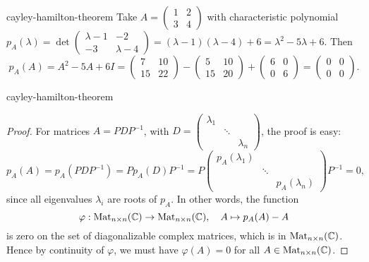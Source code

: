 \begin{example}{cayley-hamilton-theorem}
    Take $A = \begin{pmatrix} 1 & 2 \\ 3 & 4 \end{pmatrix}$ with characteristic polynomial $p_A(\lambda) = \det \begin{pmatrix} \lambda - 1 & -2 \\ -3 & \lambda - 4 \end{pmatrix} = (\lambda - 1)(\lambda - 4)  + 6 = \lambda^2 - 5 \lambda + 6$. Then
    \[ p_A(A) = A^2 - 5A + 6I = \begin{pmatrix} 7 & 10 \\ 15 & 22 \end{pmatrix} - \begin{pmatrix} 5 & 10 \\ 15 & 20 \end{pmatrix} + \begin{pmatrix} 6 & 0 \\ 0 & 6 \end{pmatrix} = \begin{pmatrix} 0 & 0 \\ 0 & 0 \end{pmatrix} . \]
\end{example}

\begin{example}{cayley-hamilton-theorem}
    \begin{proof}
        For  matrices $A = PDP^{-1}$, with $D = \begin{pmatrix} \lambda_1 && \\ & \ddots & \\ && \lambda_n \end{pmatrix}$, the proof is easy:
        \[ p_A(A) = p_A(PDP^{-1}) = P p_A(D) P^{-1} = P \begin{pmatrix} p_A(\lambda_1) & & \\ & \ddots & \\ & & p_A(\lambda_n) \end{pmatrix} P^{-1} = 0 , \]
        since all eigenvalues $\lambda_i$ are roots of $p_A$. In other words, the function
        \[ \varphi : \textup{Mat}_{n \times n}(\mathbb{C}) \to \textup{Mat}_{n \times n}(\mathbb{C}), \quad A \mapsto p_A(A) - A \]
        is zero on the set of diagonalizable complex matrices, which is  in $\textup{Mat}_{n \times n}(\mathbb{C})$. Hence by continuity of $\varphi$, we must have $\varphi(A) = 0$ for all $A \in \textup{Mat}_{n \times n}(\mathbb{C})$.
    \end{proof}
\end{example}


